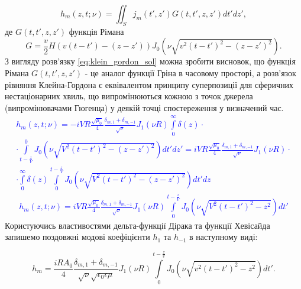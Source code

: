 \begin{equation} \label{eq:klein_gordon_sol}
h_m (z, t; \nu) = \iint_S j_m (t',z') G(t,t',z,z') dt' dz',
\end{equation}
%
де $ G(t,t',z,z') $ функція Рімана 
%
\begin{equation*}
G = \frac{\mathit{v}}{2} H \left( \mathit{v} (t-t') - (z-z') \right)
J_0 \left( \nu \sqrt{\mathit{v}^2 (t-t')^2 - (z-z')^2} \right).
\end{equation*}
%
З вигляду розв'язку \eqref{eq:klein_gordon_sol} можна зробити висновок, що
функція Рімана $ G(t,t',z,z') $ - це аналог функції Гріна в часовому просторі,
а розв'язок рівняння Клейна-Гордона є еквівалентом принципу суперпозиції
для сферичних нестаціонарних хвиль, що випромінюються кожною з точок джерела
(випромінювачами Гюгенца) у деякій точці спостереження у визначений час.
%
\textcolor{blue} { \begin{equation*} \begin{aligned}
h_m (z, t; \nu) = - i \mathit{V} R \frac{\sqrt{\mu_0}}{4} 
\frac{\delta_{m,1} + \delta_{m,-1}}{\sqrt{\nu}} J_1 (\nu R)
\int \limits_{0}^{\infty} \delta(z) \cdot \\ \cdot
\int \limits_{t - \frac{z}{\mathit{V}}}^{0} 
J_0 \left( \nu \sqrt{\mathit{V}^2 (t-t')^2 - (z-z')^2} \right) dt' dz' = 
i \mathit{V} R \frac{\sqrt{\mu_0}}{4} 
\frac{\delta_{m,1} + \delta_{m,-1}}{\sqrt{\nu}} J_1 (\nu R)
\cdot \\ \cdot \int \limits_{0}^{\infty} \delta(z)
\int \limits_{0}^{t - \frac{z}{\mathit{V}}} 
J_0 \left( \nu \sqrt{\mathit{V}^2 (t-t')^2 - (z-z')^2} \right) dt' dz
\end{aligned} \end{equation*} }
%
\textcolor{blue} { \begin{equation*} \begin{aligned}
h_m (z, t; \nu) = i \mathit{V} R \frac{\sqrt{\mu_0}}{4} 
\frac{\delta_{m,1} + \delta_{m,-1}}{\sqrt{\nu}} J_1 (\nu R)
\int \limits_{0}^{t - \frac{z}{\mathit{V}}} 
J_0 \left( \nu \sqrt{\mathit{V}^2 (t-t')^2 - z^2} \right) dt'
\end{aligned} \end{equation*} }
%
Користуючись властивостями дельта-функції Дірака та функції Хевісайда 
запишемо поздовжні модові коефіцієнти $ h_1 $ та $ h_{-1} $ в наступному 
виді:

\begin{equation} \label{eq:hm_int}
h_m = \frac{i R A_0}{4} \frac{\delta_{m,1} + \delta_{m,-1}}
{\sqrt{\nu} \sqrt{\epsilon_0 \epsilon \mu}} J_1 (\nu R) 
\int \limits_{0}^{t - \frac{z}{v}} 
J_0 \left( \nu \sqrt{v^2 (t-t')^2 - z^2} \right) dt'.
\end{equation}

